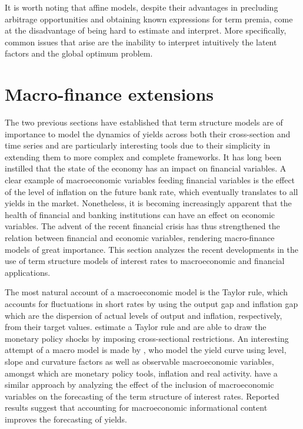 It is worth noting that affine models, despite their advantages in precluding arbitrage opportunities and obtaining known expressions for term premia, come at the disadvantage of being hard to estimate and interpret. More specifically, common issues that arise are the inability to interpret intuitively the latent factors and the global optimum problem.


\section{Macro-finance extensions}

The two previous sections have established that term structure models are of importance to model the dynamics of yields across both their cross-section and time series and are particularly interesting tools due to their simplicity in extending them to more complex and complete frameworks. It has long been instilled that the state of the economy has an impact on financial variables. A clear example of macroeconomic variables feeding financial variables is the effect of the level of inflation on the future bank rate, which eventually translates to all yields in the market. Nonetheless, it is becoming increasingly apparent that the health of financial and banking institutions can have an effect on economic variables. The advent of the recent financial crisis has thus strengthened the relation between financial and economic variables, rendering macro-finance models of great importance. This section analyzes the recent developments in the use of term structure models of interest rates to macroeconomic and financial applications.

The most natural account of a macroeconomic model is the Taylor rule, which accounts for fluctuations in short rates by using the output gap and inflation gap which are the dispersion of actual levels of output and inflation, respectively, from their target values. \cite{piazzesi_taylor_2007} estimate a Taylor rule and are able to draw the monetary policy shocks by imposing cross-sectional restrictions. An interesting attempt of a macro model is made by \cite{aruoba_2010}, who model the yield curve using level, slope and curvature factors as well as observable macroeconomic variables, amongst which are monetary policy tools, inflation and real activity. \cite{depooter_2010} have a similar approach by analyzing the effect of the inclusion of macroeconomic variables on the forecasting of the term structure of interest rates. Reported results suggest that accounting for macroeconomic informational content improves the forecasting of yields. 


